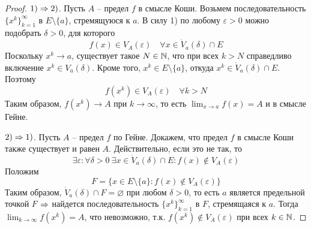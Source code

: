     \begin{proof}
        $1) \Rightarrow 2)$. Пусть $A$ -- предел $f$ в смысле Коши. Возьмем последовательность $\{x^k\}_{k = 1}^\infty$ в $E \setminus \{a\}$, стремящуюся к $a$.
        В силу 1) по любому $\varepsilon > 0$ можно подобрать $\delta > 0$, для которого
        \[f(x) \in V_A(\varepsilon) \quad \forall x \in \dot{V}_a(\delta) \cap E\]
        Поскольку $x^k \to a$, существует такое $N \in \mathbb{N}$, что при всех $k > N$ справедливо включение $x^k \in V_a(\delta)$. Кроме того, $x^k \in E \setminus \{a\}$, откуда $x^k \in \dot{V}_a(\delta) \cap E$.
        Поэтому 
        \[f(x^k) \in V_A(\varepsilon) \quad \forall k > N\]
        Таким образом, $f(x^k) \to A$ при $k \to \infty$, то есть $\lim_{x \to a} f(x) = A$ и в смысле Гейне.
        
        $2) \Rightarrow 1)$. Пусть $A$ -- предел $f$ по Гейне. Докажем, что предел $f$ в смысле Коши также существует и равен $A$.
        Действительно, если это не так, то
        \[\exists \varepsilon : \forall \delta > 0 \ \exists x \in \dot{V}_a(\delta) \cap E : f(x) \notin V_A(\varepsilon)\]
        Положим 
        \[F = \{x \in E \setminus \{a\}: f(x) \notin V_A(\varepsilon)\}\]
        Таким образом, $\dot{V}_a(\delta) \cap F = \varnothing$ при любом $\delta > 0$, то есть $a$ является предельной точкой $F$
        $\Rightarrow$ найдется последовательность $\{x^k\}_{k = 1}^\infty$ в $F$, стремящаяся к $a$. Тогда $\lim_{k \to \infty} f(x^k) = A$, что невозможно, т.к. $f(x^k) \notin V_A(\varepsilon)$ при всех $k \in \mathbb{N}$. 
         
    \end{proof}

